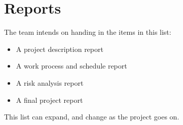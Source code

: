 \section{Reports}\label{reports}
The team intends on handing in the items in this list:
\begin{itemize}
  \item A project description report
  \item A work process and schedule report
  \item A risk analysis report
  \item A final project report
\end{itemize}

\noindent This list can expand, and change as the project goes on.